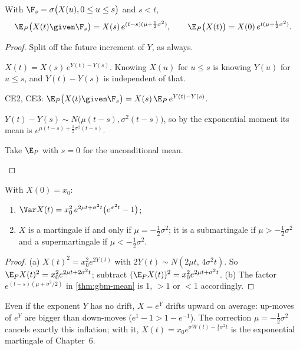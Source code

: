 \begin{theorem}
\label{thm:gbm-mean}
With $\F_s=\sigma\big(X(u),0\le u\le s\big)$ and $s<t$,
\[
  \E_P\big(X(t)\given\F_s\big)=X(s)\,e^{(t-s)(\mu+\frac12\sigma^2)},\qquad
  \E_P\big(X(t)\big)=X(0)\,e^{t(\mu+\frac12\sigma^2)} .
\]
\end{theorem}
\begin{proof}
Split off the future increment of $Y$, as always.
\begin{steps}
  \item $X(t)=X(s)\,e^{Y(t)-Y(s)}$. Knowing $X(u)$ for $u\le s$ is knowing $Y(u)$ for $u\le s$, and $Y(t)-Y(s)$ is independent of that.
  \item CE2, CE3: $\E_P\big(X(t)\given\F_s\big)=X(s)\,\E_P\,e^{Y(t)-Y(s)}$.
  \item $Y(t)-Y(s)\sim N\big(\mu(t-s),\sigma^2(t-s)\big)$, so by the exponential moment its mean is $e^{\mu(t-s)+\frac12\sigma^2(t-s)}$.
  \item Take $\E_P$ with $s=0$ for the unconditional mean. \qedhere
\end{steps}
\end{proof}

\begin{result}
\label{res:gbm-var}
With $X(0)=x_0$:
\begin{enumerate}[label=(\alph*)]
  \item $\Var X(t)=x_0^2\,e^{2\mu t+\sigma^2t}\big(e^{\sigma^2t}-1\big)$;
  \item $X$ is a martingale if and only if $\mu=-\frac12\sigma^2$; it is a submartingale if $\mu>-\frac12\sigma^2$ and a supermartingale if $\mu<-\frac12\sigma^2$.
\end{enumerate}
\end{result}
\begin{proof}
(a) $X(t)^2=x_0^2e^{2Y(t)}$ with $2Y(t)\sim N(2\mu t,\,4\sigma^2t)$. So $\E_PX(t)^2=x_0^2e^{2\mu t+2\sigma^2t}$; subtract $(\E_PX(t))^2=x_0^2e^{2\mu t+\sigma^2t}$. (b) The factor $e^{(t-s)(\mu+\sigma^2/2)}$ in \cref{thm:gbm-mean} is $1$, $>1$ or $<1$ accordingly.
\end{proof}

\begin{intuition}
Even if the exponent $Y$ has no drift, $X=e^Y$ drifts upward on average: up-moves of $e^Y$ are bigger than down-moves ($e^{1}-1>1-e^{-1}$). The correction $\mu=-\frac12\sigma^2$ cancels exactly this inflation; with it, $X(t)=x_0e^{\sigma W(t)-\frac12\sigma^2t}$ is the exponential martingale of Chapter~6.
\end{intuition}

